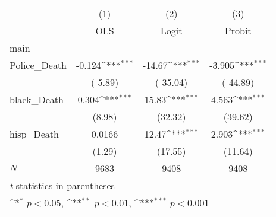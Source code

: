 {
\def\sym#1{\ifmmode^{#1}\else\(^{#1}\)\fi}
\begin{tabular}{l*{3}{c}}
\hline\hline
            &\multicolumn{1}{c}{(1)}&\multicolumn{1}{c}{(2)}&\multicolumn{1}{c}{(3)}\\
            &\multicolumn{1}{c}{OLS}&\multicolumn{1}{c}{Logit}&\multicolumn{1}{c}{Probit}\\
\hline
main        &                     &                     &                     \\
Police\_Death&      -0.124\sym{***}&      -14.67\sym{***}&      -3.905\sym{***}\\
            &     (-5.89)         &    (-35.04)         &    (-44.89)         \\
[1em]
black\_Death &       0.304\sym{***}&       15.83\sym{***}&       4.563\sym{***}\\
            &      (8.98)         &     (32.32)         &     (39.62)         \\
[1em]
hisp\_Death  &      0.0166         &       12.47\sym{***}&       2.903\sym{***}\\
            &      (1.29)         &     (17.55)         &     (11.64)         \\
\hline
\(N\)       &        9683         &        9408         &        9408         \\
\hline\hline
\multicolumn{4}{l}{\footnotesize \textit{t} statistics in parentheses}\\
\multicolumn{4}{l}{\footnotesize \sym{*} \(p<0.05\), \sym{**} \(p<0.01\), \sym{***} \(p<0.001\)}\\
\end{tabular}
}
